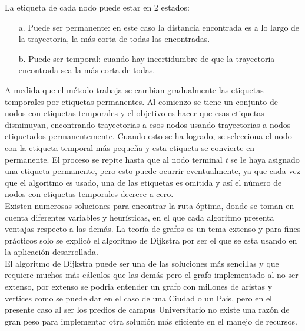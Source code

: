       La etiqueta de cada nodo puede estar en 2 estados:

      \begin{itemize}
        \item[a.] Puede ser permanente: en este caso la distancia encontrada es a lo largo de la trayectoria, la más corta de todas las encontradas.
        \item[b.] Puede ser temporal: cuando hay incertidumbre de que la trayectoria encontrada sea la más corta de todas.
      \end{itemize}

      A medida que el método trabaja se cambian gradualmente las etiquetas temporales por etiquetas permanentes. Al comienzo se tiene un conjunto de nodos con etiquetas temporales y el objetivo es hacer que esas etiquetas disminuyan, encontrando trayectorias a esos nodos usando trayectorias a nodos etiquetados permanentemente. Cuando esto se ha logrado, se selecciona el nodo con la etiqueta temporal más pequeña y esta etiqueta se convierte en permanente. El proceso se repite hasta que al nodo terminal \emph{t} se le haya asignado una etiqueta permanente, pero esto puede ocurrir eventualmente, ya que cada vez que el algoritmo es usado, una de las etiquetas es omitida y así el número de nodos con etiquetas temporales decrece a cero. \cite{teoria_grafos} \\






    Existen numerosas soluciones para encontrar la ruta óptima, donde se toman en cuenta diferentes variables y heurísticas, en el que  cada algoritmo presenta ventajas respecto a las demás.
    La teoría de grafos  es un tema extenso y para fines prácticos
    solo se explicó el algoritmo de Dijkstra por ser el que se esta usando en la aplicación desarrollada.\\

    El algoritmo de Dijkstra puede ser una de las soluciones más sencillas y que requiere muchos más cálculos que las demás pero el grafo implementado al no ser extenso, por extenso se podria entender un grafo con millones de aristas y vertices como se puede dar en el caso de una Ciudad o un Pais, pero en el presente caso al ser los predios de campus Universitario no existe una razón de gran peso para implementar otra solución más eficiente en el manejo de recursos.\\

